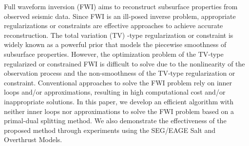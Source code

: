 Full waveform inversion (FWI) aims to reconstruct subsurface properties from observed seismic data.
Since FWI is an ill-posed inverse problem, appropriate regularizations or constraints are effective approaches to achieve accurate reconstruction.
The total variation (TV) -type regularization or constraint is widely known as a powerful prior that models the piecewise smoothness of subsurface properties.
However, the optimization problem of the TV-type regularized or constrained FWI is difficult to solve due to the nonlinearity of the observation process and the non-smoothness of the TV-type regularization or constraint.
Conventional approaches to solve the FWI problem rely on inner loops and/or approximations, resulting in high computational cost and/or inappropriate solutions.
In this paper, we develop an efficient algorithm with neither inner loops nor approximations to solve the FWI problem based on a primal-dual splitting method.
We also demonstrate the effectiveness of the proposed method through experiments using the SEG/EAGE Salt and Overthrust Models.